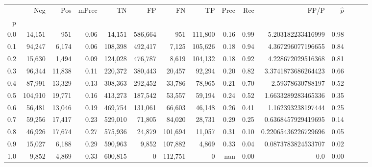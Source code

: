 \begin{tabular}{rrrrrrrrrrrrrrr}
\toprule
{} &      Neg &     Pos & mPrec &       TN &       FP &       FN &       TP &  Prec &   Rec &                 FP/P & $\hat{p}$ \\
p   &          &         &       &          &          &          &          &       &       &                      &           \\
\midrule
0.0 &   14,151 &     951 &  0.06 &   14,151 &  586,664 &      951 &  111,800 &  0.16 &  0.99 &    5.203182233416999 &      0.98 \\
0.1 &   94,247 &   6,174 &  0.06 &  108,398 &  492,417 &    7,125 &  105,626 &  0.18 &  0.94 &    4.367296077196655 &      0.84 \\
0.2 &   15,630 &   1,494 &  0.09 &  124,028 &  476,787 &    8,619 &  104,132 &  0.18 &  0.92 &    4.228672029516368 &      0.81 \\
0.3 &   96,344 &  11,838 &  0.11 &  220,372 &  380,443 &   20,457 &   92,294 &  0.20 &  0.82 &   3.3741873686264423 &      0.66 \\
0.4 &   87,991 &  13,329 &  0.13 &  308,363 &  292,452 &   33,786 &   78,965 &  0.21 &  0.70 &     2.59378630788197 &      0.52 \\
0.5 &  104,910 &  19,771 &  0.16 &  413,273 &  187,542 &   53,557 &   59,194 &  0.24 &  0.52 &   1.6633289283465336 &      0.35 \\
0.6 &   56,481 &  13,046 &  0.19 &  469,754 &  131,061 &   66,603 &   46,148 &  0.26 &  0.41 &    1.162393238197444 &      0.25 \\
0.7 &   59,256 &  17,417 &  0.23 &  529,010 &   71,805 &   84,020 &   28,731 &  0.29 &  0.25 &   0.6368457929419695 &      0.14 \\
0.8 &   46,926 &  17,674 &  0.27 &  575,936 &   24,879 &  101,694 &   11,057 &  0.31 &  0.10 &  0.22065436226729696 &      0.05 \\
0.9 &   15,027 &   6,188 &  0.29 &  590,963 &    9,852 &  107,882 &    4,869 &  0.33 &  0.04 &   0.0873783824533707 &      0.02 \\
1.0 &    9,852 &   4,869 &  0.33 &  600,815 &        0 &  112,751 &        0 &   nan &  0.00 &                  0.0 &      0.00 \\
\bottomrule
\end{tabular}
